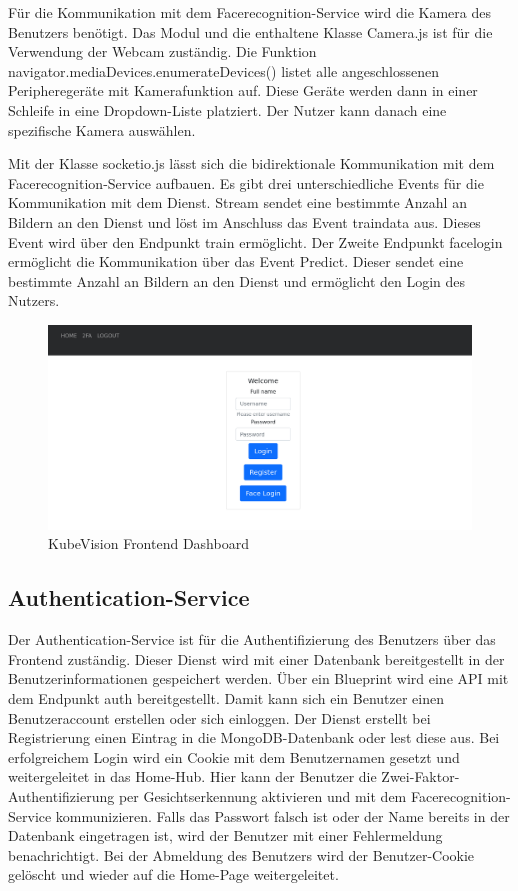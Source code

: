 Für die Kommunikation mit dem Facerecognition-Service wird die Kamera des Benutzers benötigt.
Das Modul und die enthaltene Klasse Camera.js ist für die Verwendung der Webcam zuständig.
Die Funktion navigator.mediaDevices.enumerateDevices() listet alle angeschlossenen Peripheregeräte mit Kamerafunktion auf.
Diese Geräte werden dann in einer Schleife in eine Dropdown-Liste platziert.
Der Nutzer kann danach eine spezifische Kamera auswählen.

Mit der Klasse socketio.js lässt sich die bidirektionale Kommunikation mit dem Facerecognition-Service aufbauen.
Es gibt drei unterschiedliche Events für die Kommunikation mit dem Dienst.
Stream sendet eine bestimmte Anzahl an Bildern an den Dienst und löst im Anschluss das Event traindata aus.
Dieses Event wird über den Endpunkt train ermöglicht.
Der Zweite Endpunkt facelogin ermöglicht die Kommunikation über das Event Predict.
Dieser sendet eine bestimmte Anzahl an Bildern an den Dienst und ermöglicht den Login des Nutzers.

\begin{figure}[!htb]
  \centering
  \includegraphics[width=1.0\columnwidth]{images/kubevision_home.png}
  \caption{KubeVision Frontend Dashboard}
  \label{fig:kubevision_home}
\end{figure}


\subsection{Authentication-Service}
Der Authentication-Service ist für die Authentifizierung des Benutzers über das Frontend zuständig.
Dieser Dienst wird mit einer Datenbank bereitgestellt in der Benutzerinformationen gespeichert werden.
Über ein Blueprint wird eine API mit dem Endpunkt auth bereitgestellt.
Damit kann sich ein Benutzer einen Benutzeraccount erstellen oder sich einloggen.
Der Dienst erstellt bei Registrierung einen Eintrag in die MongoDB-Datenbank oder lest diese aus.
Bei erfolgreichem Login wird ein Cookie mit dem Benutzernamen gesetzt und weitergeleitet in das Home-Hub.
Hier kann der Benutzer die Zwei-Faktor-Authentifizierung per Gesichtserkennung aktivieren und mit dem Facerecognition-Service kommunizieren.
Falls das Passwort falsch ist oder der Name bereits in der Datenbank eingetragen ist, wird der Benutzer mit einer Fehlermeldung benachrichtigt.
Bei der Abmeldung des Benutzers wird der Benutzer-Cookie gelöscht und wieder auf die Home-Page weitergeleitet.


